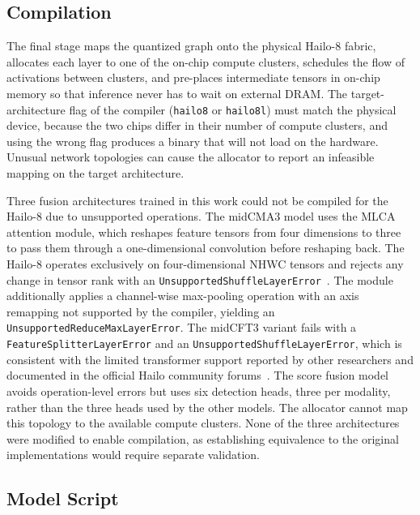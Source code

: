 \documentclass[12pt,oneside,bibtotoc,liststotoc]{scrbook}
\begin{document}
\vspace{-1em}
\subsection{Compilation}
\label{sec:hailo_compilation}

The final stage maps the quantized graph onto the physical Hailo-8
fabric, allocates each layer to one of the on-chip compute clusters,
schedules the flow of activations between clusters, and pre-places
intermediate tensors in on-chip memory so that inference never has
to wait on external DRAM.
The target-architecture flag of the compiler (\texttt{hailo8} or
\texttt{hailo8l}) must match the physical device, because the two
chips differ in their number of compute clusters, and using the
wrong flag produces a binary that will not load on the
hardware. Unusual network
topologies can cause the allocator to report an infeasible mapping
on the target architecture.~\cite{hailoDataflowCompilerUserGuide,hailo8_m2datasheet2021}

Three fusion architectures trained in this work could not be compiled for the
Hailo-8 due to unsupported operations.
The midCMA3 model uses the MLCA attention module, which reshapes feature tensors
from four dimensions to three to pass them through a one-dimensional convolution
before reshaping back.
The Hailo-8 operates exclusively on four-dimensional NHWC tensors and rejects
any change in tensor rank with an
\texttt{UnsupportedShuffleLayerError}~\cite{hailo_shuffle_reshape_5850,hailo_reshape_bchw_14560}.
The module additionally applies a channel-wise max-pooling operation with an
axis remapping not supported by the compiler, yielding an
\texttt{UnsupportedReduceMaxLayerError}.
The midCFT3 variant fails with a \texttt{FeatureSplitterLayerError} and an
\texttt{UnsupportedShuffleLayerError}, which is consistent with the limited
transformer support reported by other researchers and documented in the official
Hailo community forums~\cite{suchy2026reviewYOLODETREdgeDevices,hailo_multihead_attention_968}.
The score fusion model avoids operation-level errors but uses six detection
heads, three per modality, rather than the three heads used by the other models.
The allocator cannot map this topology to the available compute clusters.
None of the three architectures were modified to enable compilation, as
establishing equivalence to the original implementations would require separate
validation.

\vspace{-1em}
\subsection{Model Script}
\end{document}
